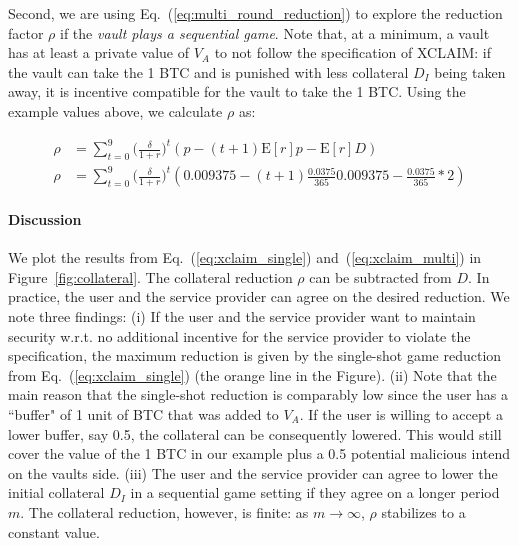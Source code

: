 \documentclass[runningheads]{llncs}
\begin{document}
Second, we are using Eq.~(\ref{eq:multi_round_reduction}) to explore the reduction factor $\rho$ if the \textit{vault plays a sequential game}.
Note that, at a minimum, a vault has at least a private value of $V_A$ to not follow the specification of XCLAIM: if the vault can take the 1 BTC and is punished with less collateral $D_I$ being taken away, it is incentive compatible for the vault to take the 1 BTC. Using the example values above, we calculate $\rho$ as:

\begin{equation}
\label{eq:xclaim_multi}
\begin{split}
\rho &= \sum_{t=0}^{9} \big( \frac{\delta}{1+r} \big)^{t} ( p - (t+1)\mathrm{E}[r]p - \mathrm{E}[r]D) \\
\rho &= \sum_{t=0}^{9} \big( \frac{\delta}{1+r} \big)^{t} ( 0.009375 - (t+1)\frac{0.0375}{365}0.009375 - \frac{0.0375}{365}*2)
\end{split}
\end{equation}

\paragraph{Discussion}

We plot the results from Eq.~(\ref{eq:xclaim_single}) and~(\ref{eq:xclaim_multi}) in Figure~\ref{fig:collateral}.
The collateral reduction $\rho$ can be subtracted from $D$.
In practice, the user and the service provider can agree on the desired reduction.
We note three findings:
(i) If the user and the service provider want to maintain security w.r.t. no additional incentive for the service provider to violate the specification, the maximum reduction is given by the single-shot game reduction from Eq.~(\ref{eq:xclaim_single}) (the orange line in the Figure).
(ii) Note that the main reason that the single-shot reduction is comparably low since the user has a ``buffer" of 1 unit of BTC that was added to $V_A$.
If the user is willing to accept a lower buffer, say 0.5, the collateral can be consequently lowered.
This would still cover the value of the 1 BTC in our example plus a 0.5 potential malicious intend on the vaults side.
(iii) The user and the service provider can agree to lower the initial collateral $D_I$ in a sequential game setting if they agree on a longer period $m$.
The collateral reduction, however, is finite: as $m \to \infty$, $\rho$ stabilizes to a constant value.
\end{document}
